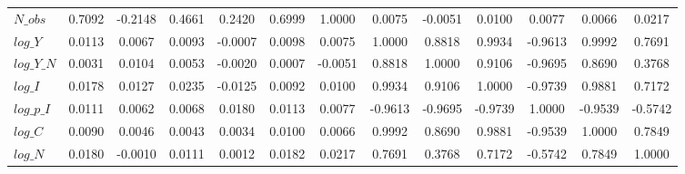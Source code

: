 \begin{center}
\begin{longtable}{lcccccccccccc}
$N\_obs     $	 & 	       0.7092	 & 	      -0.2148	 & 	       0.4661	 & 	       0.2420	 & 	       0.6999	 & 	       1.0000	 & 	       0.0075	 & 	      -0.0051	 & 	       0.0100	 & 	       0.0077	 & 	       0.0066	 & 	       0.0217 \\ 
$log\_Y     $	 & 	       0.0113	 & 	       0.0067	 & 	       0.0093	 & 	      -0.0007	 & 	       0.0098	 & 	       0.0075	 & 	       1.0000	 & 	       0.8818	 & 	       0.9934	 & 	      -0.9613	 & 	       0.9992	 & 	       0.7691 \\ 
$log\_Y\_N  $	 & 	       0.0031	 & 	       0.0104	 & 	       0.0053	 & 	      -0.0020	 & 	       0.0007	 & 	      -0.0051	 & 	       0.8818	 & 	       1.0000	 & 	       0.9106	 & 	      -0.9695	 & 	       0.8690	 & 	       0.3768 \\ 
$log\_I     $	 & 	       0.0178	 & 	       0.0127	 & 	       0.0235	 & 	      -0.0125	 & 	       0.0092	 & 	       0.0100	 & 	       0.9934	 & 	       0.9106	 & 	       1.0000	 & 	      -0.9739	 & 	       0.9881	 & 	       0.7172 \\ 
$log\_p\_I  $	 & 	       0.0111	 & 	       0.0062	 & 	       0.0068	 & 	       0.0180	 & 	       0.0113	 & 	       0.0077	 & 	      -0.9613	 & 	      -0.9695	 & 	      -0.9739	 & 	       1.0000	 & 	      -0.9539	 & 	      -0.5742 \\ 
$log\_C     $	 & 	       0.0090	 & 	       0.0046	 & 	       0.0043	 & 	       0.0034	 & 	       0.0100	 & 	       0.0066	 & 	       0.9992	 & 	       0.8690	 & 	       0.9881	 & 	      -0.9539	 & 	       1.0000	 & 	       0.7849 \\ 
$log\_N     $	 & 	       0.0180	 & 	      -0.0010	 & 	       0.0111	 & 	       0.0012	 & 	       0.0182	 & 	       0.0217	 & 	       0.7691	 & 	       0.3768	 & 	       0.7172	 & 	      -0.5742	 & 	       0.7849	 & 	       1.0000 \\ 
\end{longtable}
 \end{center}
